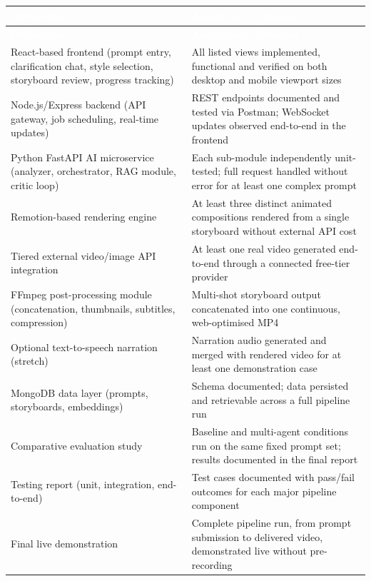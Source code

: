 \documentclass[11pt,a4paper]{article}
\newcommand{\tblhead}[1]{\cellcolor{headerblue}\textcolor{white}{\textbf{#1}}}
\begin{document}
\begin{center}
\begin{longtable}{|p{6.3cm}|p{7.7cm}|}
\hline
\tblhead{Deliverable} & \tblhead{Acceptance Criterion} \\
\hline
\endfirsthead
\hline
\tblhead{Deliverable} & \tblhead{Acceptance Criterion} \\
\hline
\endhead
React-based frontend (prompt entry, clarification chat, style selection, storyboard review, progress tracking) & All listed views implemented, functional and verified on both desktop and mobile viewport sizes \\
\hline
Node.js/Express backend (API gateway, job scheduling, real-time updates) & REST endpoints documented and tested via Postman; WebSocket updates observed end-to-end in the frontend \\
\hline
Python FastAPI AI microservice (analyzer, orchestrator, RAG module, critic loop) & Each sub-module independently unit-tested; full request handled without error for at least one complex prompt \\
\hline
Remotion-based rendering engine & At least three distinct animated compositions rendered from a single storyboard without external API cost \\
\hline
Tiered external video/image API integration & At least one real video generated end-to-end through a connected free-tier provider \\
\hline
FFmpeg post-processing module (concatenation, thumbnails, subtitles, compression) & Multi-shot storyboard output concatenated into one continuous, web-optimised MP4 \\
\hline
Optional text-to-speech narration (stretch) & Narration audio generated and merged with rendered video for at least one demonstration case \\
\hline
MongoDB data layer (prompts, storyboards, embeddings) & Schema documented; data persisted and retrievable across a full pipeline run \\
\hline
Comparative evaluation study & Baseline and multi-agent conditions run on the same fixed prompt set; results documented in the final report \\
\hline
Testing report (unit, integration, end-to-end) & Test cases documented with pass/fail outcomes for each major pipeline component \\
\hline
Final live demonstration & Complete pipeline run, from prompt submission to delivered video, demonstrated live without pre-recording \\
\hline
\end{longtable}
\end{center}
\vspace{-0.3cm}
\begin{center}
\label{tab:scope}
\end{center}
\end{document}
